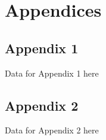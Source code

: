 \chapter*{Appendices}

\section{Appendix 1}
Data for Appendix 1 here

\section{Appendix 2}
Data for Appendix 2 here
